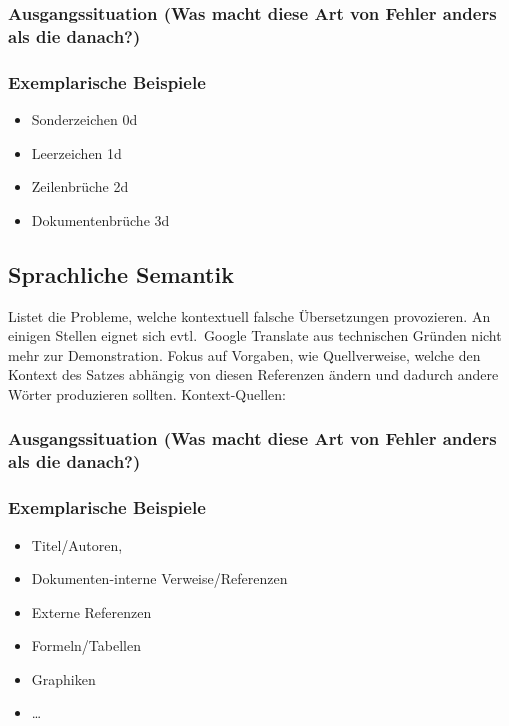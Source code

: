 \subsubsection{Ausgangssituation (Was macht diese Art von Fehler anders als die danach?)}
\subsubsection{Exemplarische Beispiele}
\begin{itemize}
    \item Sonderzeichen 0d
    \item Leerzeichen 1d
    \item Zeilenbrüche 2d
    \item Dokumentenbrüche 3d
\end{itemize}

\subsection{Sprachliche Semantik}%
Listet die Probleme, welche kontextuell falsche Übersetzungen provozieren. An einigen Stellen eignet sich evtl.\ Google Translate aus technischen Gründen nicht mehr zur Demonstration.
Fokus auf Vorgaben, wie Quellverweise, welche den Kontext des Satzes abhängig von diesen Referenzen ändern und dadurch andere Wörter produzieren sollten.
Kontext-Quellen:
\subsubsection{Ausgangssituation (Was macht diese Art von Fehler anders als die danach?)}
\subsubsection{Exemplarische Beispiele}
\begin{itemize}
    \item Titel/Autoren,
    \item Dokumenten-interne Verweise/Referenzen
    \item Externe Referenzen
    \item Formeln/Tabellen
    \item Graphiken
    \item \ldots
\end{itemize}

